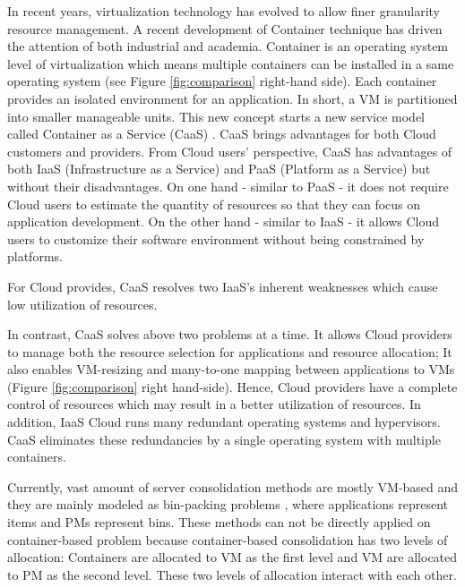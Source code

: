 In recent years, virtualization technology has evolved to allow finer granularity resource management.
A recent development of Container technique \cite{Soltesz:2007cu} has driven the attention of both industrial and academia.
Container is an operating system level of virtualization which means multiple containers can be installed in a same operating system (see Figure \ref{fig:comparison} right-hand side). Each container provides an isolated environment for an application. In short, a VM is partitioned into smaller manageable units.
This new concept starts a new service model called Container as a Service (CaaS) \cite{Piraghaj:2015uf}. CaaS brings advantages for both Cloud customers and providers.
From Cloud users' perspective, CaaS has advantages of both IaaS (Infrastructure as a Service) and PaaS (Platform as a Service) but without their disadvantages. On one hand - similar to PaaS - it does not require Cloud users to estimate the quantity of resources so that they can focus on application development. On the other hand - similar to IaaS - it allows Cloud users to customize their software environment without being constrained by platforms. 

For Cloud provides, CaaS resolves two IaaS's inherent weaknesses which cause low utilization of resources.



In contrast, CaaS solves above two problems at a time. It allows Cloud providers to manage both the resource selection for applications and resource allocation; It also enables VM-resizing and many-to-one mapping between applications to VMs (Figure \ref{fig:comparison} right hand-side).
Hence, Cloud providers have a complete control of resources which may result in a better utilization of resources. 
In addition, IaaS Cloud runs many redundant operating systems and hypervisors. CaaS eliminates these redundancies by a single operating system with multiple containers.

\vspace{10mm}

Currently, vast amount of server consolidation methods are mostly VM-based and they are mainly modeled as bin-packing problems \cite{Mann:2015ua}, where applications represent items and PMs represent bins. These methods can not be directly applied on container-based problem because container-based consolidation has two levels of allocation: Containers are allocated to VM as the first level and VM are allocated to PM as the second level. These two levels of allocation interact with each other. 

